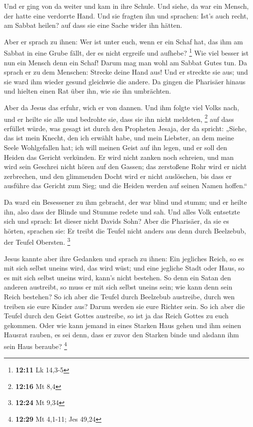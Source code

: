  Und er ging von da weiter und kam in ihre Schule.
 Und siehe, da war ein Mensch, der hatte eine verdorrte
Hand. Und sie fragten ihn und sprachen: Ist's auch recht, am Sabbat
heilen? auf dass sie eine Sache wider ihn hätten.

 Aber er sprach zu ihnen: Wer ist unter euch, wenn er ein
Schaf hat, das ihm am Sabbat in eine Grube fällt, der es nicht ergreife
und aufhebe? \footnote{\textbf{12:11} Lk 14,3-5}  Wie viel
besser ist nun ein Mensch denn ein Schaf! Darum mag man wohl am Sabbat
Gutes tun.  Da sprach er zu dem Menschen: Strecke deine
Hand aus! Und er streckte sie aus; und sie ward ihm wieder gesund
gleichwie die andere.  Da gingen die Pharisäer hinaus und
hielten einen Rat über ihn, wie sie ihn umbrächten.

 Aber da Jesus das erfuhr, wich er von dannen. Und ihm
folgte viel Volks nach, und er heilte sie alle  und
bedrohte sie, dass sie ihn nicht meldeten, \footnote{\textbf{12:16} Mt
  8,4}  auf dass erfüllet würde, was gesagt ist durch den
Propheten Jesaja, der da spricht:  „Siehe, das ist mein
Knecht, den ich erwählt habe, und mein Liebster, an dem meine Seele
Wohlgefallen hat; ich will meinen Geist auf ihn legen, und er soll den
Heiden das Gericht verkünden.  Er wird nicht zanken noch
schreien, und man wird sein Geschrei nicht hören auf den Gassen;
 das zerstoßene Rohr wird er nicht zerbrechen, und den
glimmenden Docht wird er nicht auslöschen, bis dass er ausführe das
Gericht zum Sieg;  und die Heiden werden auf seinen Namen
hoffen.``

 Da ward ein Besessener zu ihm gebracht, der war blind und
stumm; und er heilte ihn, also dass der Blinde und Stumme redete und
sah.  Und alles Volk entsetzte sich und sprach: Ist dieser
nicht Davids Sohn?  Aber die Pharisäer, da sie es hörten,
sprachen sie: Er treibt die Teufel nicht anders aus denn durch
Beelzebub, der Teufel Obersten. \footnote{\textbf{12:24} Mt 9,34}

 Jesus kannte aber ihre Gedanken und sprach zu ihnen: Ein
jegliches Reich, so es mit sich selbst uneins wird, das wird wüst; und
eine jegliche Stadt oder Haus, so es mit sich selbst uneins wird, kann's
nicht bestehen.  So denn ein Satan den anderen austreibt,
so muss er mit sich selbst uneins sein; wie kann denn sein Reich
bestehen?  So ich aber die Teufel durch Beelzebub
austreibe, durch wen treiben sie eure Kinder aus? Darum werden sie eure
Richter sein.  So ich aber die Teufel durch den Geist
Gottes austreibe, so ist ja das Reich Gottes zu euch gekommen.
 Oder wie kann jemand in eines Starken Haus gehen und ihm
seinen Hausrat rauben, es sei denn, dass er zuvor den Starken binde und
alsdann ihm sein Haus beraube? \footnote{\textbf{12:29} Mt 4,1-11; Jes
  49,24}

